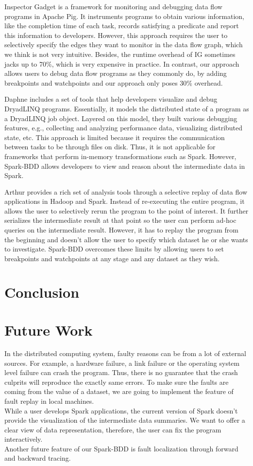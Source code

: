 \documentclass{acm_proc_article-sp}
\begin{document}
Inspector Gadget is a framework for monitoring and debugging data flow programs in Apache Pig. It instruments programs to obtain various information, like the completion time of each task, records satisfying a predicate and report this information to developers. However, this approach requires the user to selectively specify the edges they want to monitor in the data flow graph, which we think is not very intuitive. Besides, the runtime overhead of IG sometimes jacks up to 70\%, which is very expensive in practice. In contrast, our approach allows users to debug data flow programs as they commonly do, by adding breakpoints and watchpoints and our approach only poses 30\% overhead. 

Daphne includes a set of tools that help developers visualize and debug DryadLINQ programs. Essentially, it models the distributed state of a program as a DryadLINQ job object. Layered on this model, they built various debugging features, e.g., collecting and analyzing performance data, visualizing distributed state, etc. This approach is limited because it requires the communication between tasks to be through files on disk. Thus, it is not applicable for frameworks that perform in-memory transformations such as Spark. However, Spark-BDD allows developers to view and reason about the intermediate data in Spark. 

Arthur provides a rich set of analysis tools through a selective replay of data flow applications in Hadoop and Spark. Instead of re-executing the entire program, it allows the user to selectively rerun the program to the point of interest. It further serializes the intermediate result at that point so the user can perform ad-hoc queries on the intermediate result. However, it has to replay the program from the beginning and doesn't allow the user to specify which dataset he or she wants to investigate. Spark-BDD overcomes these limits by allowing users to set breakpoints and watchpoints at any stage and any dataset as they wish.

\section{Conclusion}

\section{Future Work}
In the distributed computing system, faulty reasons can be from a lot of external sources. For example, a hardware failure, a link failure or the operating system level failure can crash the program. Thus, there is no guarantee that the crash culprits will reproduce the exactly same errors. To make sure the faults are coming from the value of a dataset, we are going to implement the feature of fault replay in local machines.\\
While a user develops Spark applications, the current version of Spark doesn't provide the visualization of the intermediate data summaries. We want to offer a clear view of data representation, therefore, the user can fix the program interactively.\\
Another future feature of our Spark-BDD is fault localization through forward and backward tracing.


  
\balancecolumns
\end{document}
